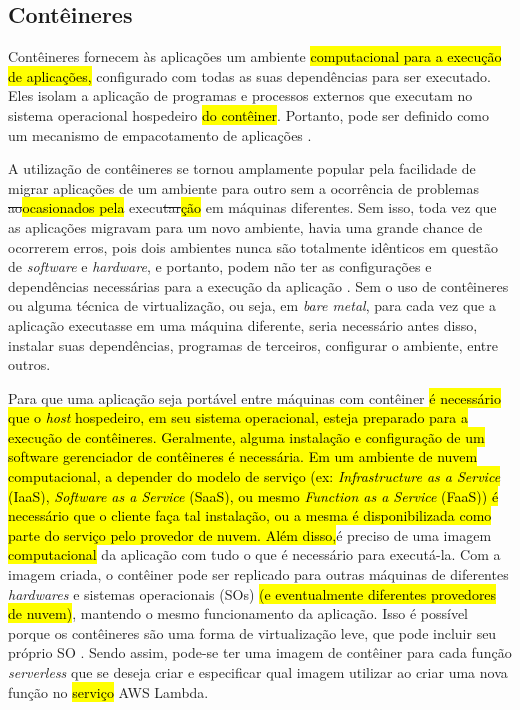 \documentclass[10pt,conference]{IEEEtran}
\begin{document}
\subsection{Contêineres}
\label{subsec:containers}

Contêineres fornecem às aplicações um ambiente \hl{computacional para a execução de aplicações, }configurado com todas as suas dependências para ser executado. Eles isolam a aplicação de programas e processos externos que executam no sistema operacional hospedeiro \hl{do contêiner}. Portanto, pode ser definido como um mecanismo de empacotamento de aplicações \cite{Siddiqui_2019_analysis_container}. 

A utilização de contêineres se tornou amplamente popular pela facilidade de migrar aplicações de um ambiente para outro sem a ocorrência de problemas \st{ao}\hl{ocasionados pela} execu\st{tar}\hl{ção} em máquinas diferentes. Sem isso, toda vez que as aplicações migravam para um novo ambiente, havia uma grande chance de ocorrerem erros, pois dois ambientes nunca são totalmente idênticos em questão de \textit{software} e \textit{hardware}, e portanto, podem não ter as configurações e dependências necessárias para a execução da aplicação  \cite{Siddiqui_2019_analysis_container}. Sem o uso de contêineres ou alguma técnica de virtualização, ou seja, em \textit{bare metal}, para cada vez que a aplicação executasse em uma máquina diferente, seria necessário antes disso, instalar suas dependências, programas de terceiros, configurar o ambiente, entre outros.

Para que uma aplicação seja portável entre máquinas com contêiner \hl{é necessário que o \textit{host} hospedeiro, em seu sistema operacional, esteja preparado para a execução de contêineres. Geralmente, alguma instalação e configuração de um software gerenciador de contêineres é necessária. Em um ambiente de nuvem computacional, a depender do modelo de serviço (ex: \textit{Infrastructure as a Service} (IaaS), \textit{Software as a Service} (SaaS), ou mesmo \textit{Function as a Service} (FaaS)) é necessário que o cliente faça tal instalação, ou a mesma é disponibilizada como parte do serviço pelo provedor de nuvem. Além disso,}é preciso de uma imagem \hl{computacional} da aplicação com tudo o que é necessário para executá-la. Com a imagem criada, o contêiner pode ser replicado para outras máquinas de diferentes \textit{hardwares} e sistemas operacionais (SOs) \hl{(e eventualmente diferentes provedores de nuvem)}, mantendo o mesmo funcionamento da aplicação. Isso é possível porque os contêineres são uma forma de virtualização leve, que pode incluir seu próprio SO \cite{scheepers_2014_virtualization_containerization}. Sendo assim, pode-se ter uma imagem de contêiner para cada função \textit{serverless} que se deseja criar e especificar qual imagem utilizar ao criar uma nova função no \hl{serviço} AWS Lambda. 
\end{document}
